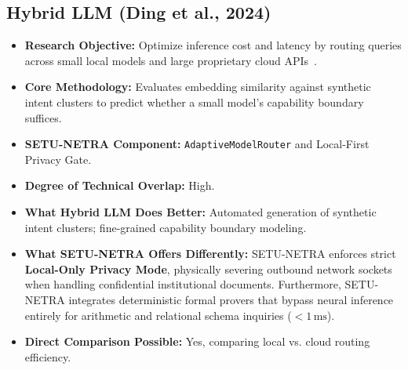 \documentclass[11pt,a4paper]{article}
\begin{document}
\subsection{Hybrid LLM (Ding et al., 2024)}
\begin{itemize}[leftmargin=*]
    \item \textbf{Research Objective:} Optimize inference cost and latency by routing queries across small local models and large proprietary cloud APIs~\cite{Ding2024HybridLLM}.
    \item \textbf{Core Methodology:} Evaluates embedding similarity against synthetic intent clusters to predict whether a small model's capability boundary suffices.
    \item \textbf{SETU-NETRA Component:} \texttt{AdaptiveModelRouter} and Local-First Privacy Gate.
    \item \textbf{Degree of Technical Overlap:} High.
    \item \textbf{What Hybrid LLM Does Better:} Automated generation of synthetic intent clusters; fine-grained capability boundary modeling.
    \item \textbf{What SETU-NETRA Offers Differently:} SETU-NETRA enforces strict \textbf{Local-Only Privacy Mode}, physically severing outbound network sockets when handling confidential institutional documents. Furthermore, SETU-NETRA integrates deterministic formal provers that bypass neural inference entirely for arithmetic and relational schema inquiries ($< 1\,\text{ms}$).
    \item \textbf{Direct Comparison Possible:} Yes, comparing local vs. cloud routing efficiency.
\end{itemize}

\end{document}
